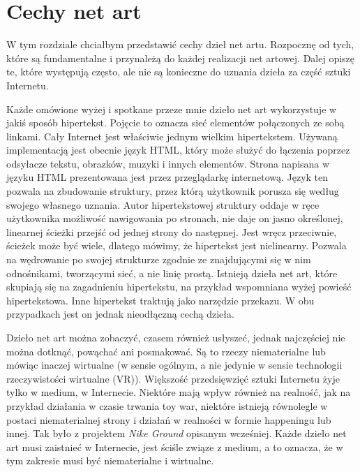 \documentclass[a4paper,12pt,twoside]{article}
\begin{document}
\section{Cechy net art}
W tym rozdziale chciałbym przedstawić cechy dzieł net artu.
Rozpocznę od tych, które są fundamentalne i przynależą do każdej
realizacji net artowej. Dalej opiszę te, które występują często,
ale nie są konieczne do uznania dzieła za część sztuki Internetu.

Każde omówione wyżej i spotkane przeze mnie dzieło net art wykorzystuje
w jakiś sposób hipertekst. Pojęcie to oznacza sieć elementów
połączonych ze sobą linkami. Cały Internet jest właściwie jednym
wielkim hipertekstem. Używaną implementacją jest obecnie język
HTML, który może służyć do łączenia poprzez odsyłacze tekstu, obrazków,
muzyki i innych elementów. Strona napisana w języku HTML prezentowana
jest przez przeglądarkę internetową. Język ten pozwala na zbudowanie
struktury, przez którą użytkownik porusza się według swojego własnego
uznania. Autor hipertekstowej struktury oddaje w ręce użytkownika
możliwość nawigowania po stronach, nie daje on jasno określonej,
linearnej ścieżki przejść od jednej strony do następnej. Jest wręcz
przeciwnie, ścieżek może być wiele, dlatego mówimy, że hipertekst
jest nielinearny. Pozwala na wędrowanie po swojej strukturze zgodnie
ze znajdującymi się w nim odnośnikami, tworzącymi sieć, a nie linię
prostą. Istnieją dzieła net art, które skupiają się na zagadnieniu
hipertekstu, na przykład wspomniana wyżej powieść hipertekstowa.
Inne hipertekst traktują jako narzędzie przekazu. W obu przypadkach
jest on jednak nieodłączną cechą dzieła.

Dzieło net art można zobaczyć, czasem również usłyszeć, jednak najczęściej
nie można dotknąć, powąchać ani posmakować. Są to rzeczy niematerialne
lub mówiąc inaczej wirtualne (w sensie ogólnym, a nie jedynie w sensie
technologii rzeczywistości wirtualne (VR)).
Większość przedsięwzięć sztuki Internetu
żyje tylko w medium, w Internecie. Niektóre mają wpływ również na
realność, jak na przykład działania w czasie trwania toy war, niektóre
istnieją równolegle w postaci niematerialnej strony i działań w realności
w formie happeningu lub innej. Tak było z projektem \textit{Nike Ground}
opisanym wcześniej. Każde dzieło net art musi zaistnieć w Internecie,
jest ściśle związe z medium, a to oznacza, że w tym zakresie musi
być niematerialne i wirtualne.
\end{document}
